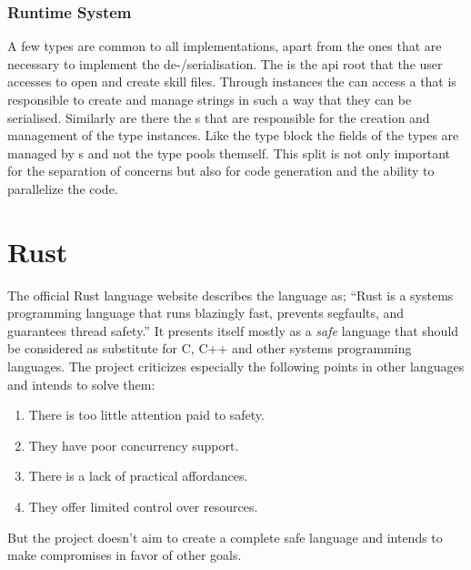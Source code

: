 \documentclass[thesis]{subfiles}
\begin{document}
    \subsubsection{Runtime System}
      A few types are common to all implementations, apart from the ones that are necessary to implement the de-/serialisation.
      The  is the \gls{api} root that the user accesses to open and create \gls{skill} files.
      Through  instances the can access a  that is responsible to create and manage strings in such a way that they can be serialised.
      Similarly are there the s that are responsible for the creation and management of the type instances.
      Like the type block the fields of the types are managed by s and not the type pools themself.
      This split is not only important for the separation of concerns but also for code generation and the ability to parallelize the code.

\section{Rust}
  \label{sec:rust}

  The official Rust language website describes the language as;
  \enquote{Rust is a systems programming language that runs blazingly fast, prevents segfaults, and guarantees thread safety.}\autocite{rust-org}
  It presents itself mostly as a \emph{safe} language that should be considered as substitute for C, C++ and other systems programming languages.
  The project criticizes especially the following points in other languages and intends to solve them\autocite{rust-org}:
  \begin{enumerate}
    \item There is too little attention paid to safety.
    \item They have poor concurrency support.
    \item There is a lack of practical affordances.
    \item They offer limited control over resources.
  \end{enumerate}
  But the project doesn't aim to create a complete safe language and intends to make compromises in favor of other goals.
\end{document}
